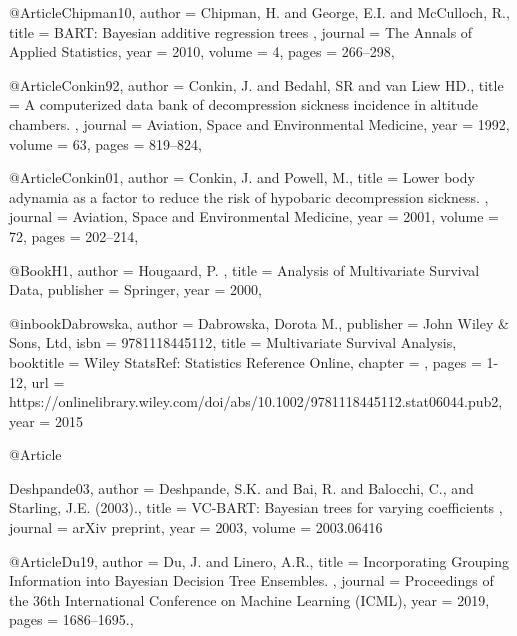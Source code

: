 @Article{Chipman10,
   author =   {Chipman, H. and George, E.I.   and McCulloch, R.},
   title =    {BART: Bayesian additive regression trees },
   journal =      {The Annals of Applied Statistics},
   year =     {2010},
   volume =   {4},
   pages =    {266--298},
 }

 



@Article{Conkin92,
   author =   {Conkin, J. and Bedahl, SR and van Liew HD.},
   title =    { A computerized data bank of decompression sickness incidence in altitude chambers. },
   journal =      {Aviation, Space and Environmental Medicine},
   year =     {1992},
   volume =   {63},
   pages =    {819--824},
 }






@Article{Conkin01,
   author =   {Conkin, J. and Powell, M.},
   title =    {  Lower body adynamia as a factor to reduce the risk of hypobaric decompression sickness. },
   journal =      {Aviation, Space and Environmental Medicine},
   year =     {2001},
   volume =   {72},
   pages =    {202--214},
 }



@Book{H1,
   author =   {Hougaard, P. },
   title =    {Analysis of Multivariate Survival Data},
   publisher =    {Springer},
   year =     {2000},
}









@inbook{Dabrowska,
author = {Dabrowska, Dorota M.},
publisher = {John Wiley & Sons, Ltd},
isbn = {9781118445112},
title = {Multivariate Survival Analysis},
booktitle = {Wiley StatsRef: Statistics Reference Online},
chapter = {},
pages = {1-12},
url = {https://onlinelibrary.wiley.com/doi/abs/10.1002/9781118445112.stat06044.pub2},
year = {2015} }




 @Article{Deshpande03,
   author =   { Deshpande, S.K. and Bai, R. and Balocchi, C., and Starling, J.E. (2003).},
   title =    { VC-BART: Bayesian trees for varying coefficients },
   journal =      {arXiv preprint},
   year =     {2003},
   volume =   {2003.06416}
   
 }

     



@Article{Du19,
   author =   {Du, J. and Linero, A.R.},
   title =    { Incorporating Grouping Information into Bayesian Decision Tree Ensembles. },
   journal =      {Proceedings of the 36th International
Conference on Machine Learning (ICML)},
   year =     {2019},
   pages =    {1686--1695.},
 }




